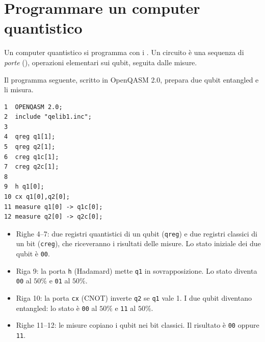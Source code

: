 \section{Programmare un computer quantistico}
\label{sec:qse-programmare}

Un computer quantistico si programma con i . Un circuito è una sequenza di \emph{porte}
(), operazioni elementari sui qubit, seguita dalle misure.

\begin{esempio}
Il programma seguente, scritto in OpenQASM 2.0, prepara due qubit entangled e li misura.
\begin{verbatim}
1  OPENQASM 2.0;
2  include "qelib1.inc";
3
4  qreg q1[1];
5  qreg q2[1];
6  creg q1c[1];
7  creg q2c[1];
8
9  h q1[0];
10 cx q1[0],q2[0];
11 measure q1[0] -> q1c[0];
12 measure q2[0] -> q2c[0];
\end{verbatim}
\begin{itemize}
  \item Righe 4--7: due registri quantistici di un qubit (\texttt{qreg}) e due registri classici di un bit
    (\texttt{creg}), che riceveranno i risultati delle misure. Lo stato iniziale dei due qubit è \texttt{00}.
  \item Riga 9: la porta \texttt{h} (Hadamard) mette \texttt{q1} in sovrapposizione. Lo stato diventa \texttt{00} al
    $50\%$ e \texttt{01} al $50\%$.
  \item Riga 10: la porta \texttt{cx} (CNOT) inverte \texttt{q2} se \texttt{q1} vale 1. I due qubit diventano
    entangled: lo stato è \texttt{00} al $50\%$ e \texttt{11} al $50\%$.
  \item Righe 11--12: le misure copiano i qubit nei bit classici. Il risultato è \texttt{00} oppure \texttt{11}.
\end{itemize}
\end{esempio}

